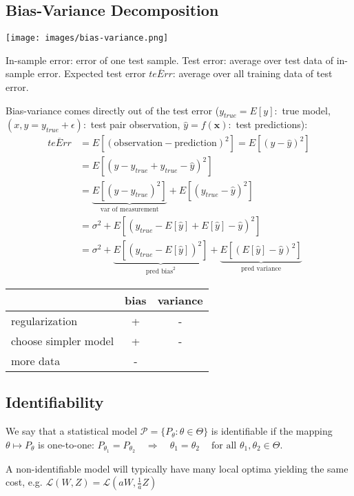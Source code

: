 \documentclass[10pt,a4paper,landscape]{article}
\renewcommand{\bf}[1]{\ensuremath{\mathbf{#1}}}
\begin{document}
\begin{multicols*}{4}
\subsection{Bias-Variance Decomposition}
\begin{colfig}
  \centering
  \texttt{[image: images/bias-variance.png]}
\end{colfig}

In-sample error: error of one test sample. Test error: average over test data of in-sample error. Expected test error $\overline{teErr}$: average over all training data of test error. 

Bias-variance comes directly out of the test error ($y_{true}=E[y]:$ true model, $(x,y = y_{true} + \epsilon):$ test pair observation, $\hat{y}=f(\bf{x}):$ test predictions):
 \begin{align*}
 \overline{teErr}
 &= E[(\text{observation} - \text{prediction})^2] = E[(y - \hat{y})^2] \\
 &= E[(y - y_{true} + y_{true} - \hat{y})^2] \\
 &=\underbrace{E[(y - y_{true})^2]}_{\text{var of measurement}} + E[(y_{true} - \hat{y})^2] \\
 &=\sigma^2 + E[(y_{true} - E[\hat{y}] + E[\hat{y}] - \hat{y})^2] \\
 &=\sigma^2 + \underbrace{E[(y_{true} - E[\hat{y}])^2]}_{\text{pred bias}^2} +\underbrace{E[(E[\hat{y}] - \hat{y})^2]}_{\text{pred variance}}
\end{align*}

\begin{tabular}{ l || c | c }
                          & bias & variance \\
  \hline
  regularization          & +    & - \\
  choose simpler model    & +    & - \\
  more data               & -    & \\
  \hline
\end{tabular}

\subsection{Identifiability}
We say that a statistical model $\mathcal{P} = \{P_\theta: \theta \in \Theta\}$ is identifiable if the mapping $\theta \mapsto P_\theta$ is one-to-one:
$P_{\theta_1}=P_{\theta_2} \quad\Rightarrow\quad \theta_1=\theta_2 \quad\ \text{for all } \theta_1,\theta_2\in\Theta.$

A non-identifiable model will typically have many local optima yielding the same cost, e.g. $\mathcal{L}(W, Z) = \mathcal{L}(aW, \frac{1}{a} Z)$


\end{multicols*}
\end{document}
